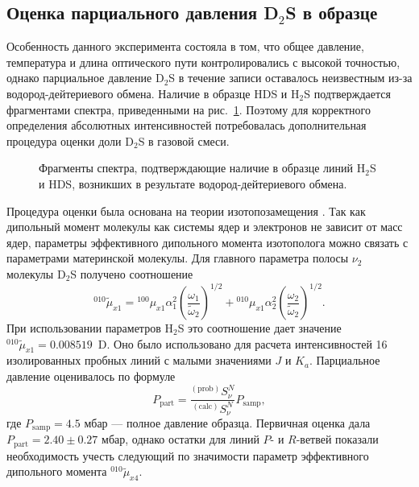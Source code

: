 \subsection{Оценка парциального давления D$_2$S в образце}

Особенность данного эксперимента состояла в том, что общее давление, температура и длина оптического
пути контролировались с высокой точностью, однако парциальное давление D$_2$S в течение записи
оставалось неизвестным из-за водород-дейтериевого обмена. Наличие в образце HDS и H$_2$S подтверждается
фрагментами спектра, приведенными на рис.~\ref{fig:d2s_hds_h2s}. Поэтому для корректного определения
абсолютных интенсивностей потребовалась дополнительная процедура оценки доли D$_2$S в газовой смеси.

\begin{figure}[htbp]
    \centering
    \caption{Фрагменты спектра, подтверждающие наличие в образце линий H$_2$S и HDS, возникших в
    результате водород-дейтериевого обмена.}
    \label{fig:d2s_hds_h2s}
\end{figure}

Процедура оценки была основана на теории изотопозамещения \cite{byk,Ulenikov2019a,Ulenikov2020a}. Так
как дипольный момент молекулы как системы ядер и электронов не зависит от масс ядер, параметры
эффективного дипольного момента изотополога можно связать с параметрами материнской молекулы. Для
главного параметра полосы $\nu_2$ молекулы D$_2$S получено соотношение
\begin{equation}
{}^{010}\widetilde{\mu}_{x1}= {}^{100}\mu_{x1}\alpha^2_1
\left(\frac{\omega_1}{\widetilde{\omega}_2}\right)^{1/2}+
{}^{010}\mu_{x1}\alpha^2_2
\left(\frac{\omega_2}{\widetilde{\omega}_2}\right)^{1/2}.
\label{eq:d2s_mu_iso}
\end{equation}
При использовании параметров H$_2$S \cite{h2s_ulenikov2018_bending,h2s_lechuga1984} это соотношение
дает значение ${}^{010}\widetilde{\mu}_{x1}=0.008519$~D. Оно было использовано для расчета
интенсивностей 16 изолированных пробных линий с малыми значениями $J$ и $K_a$. Парциальное давление
оценивалось по формуле
\begin{equation}
P_{\text{part}}=\frac{{}^{(\text{prob})}S^N_{\nu}}{{}^{(\text{calc})}S^N_{\nu}}P_{\text{samp}},
\label{eq:d2s_partial_pressure}
\end{equation}
где $P_{\text{samp}}=4.5$ мбар --- полное давление образца. Первичная оценка дала
$P_{\text{part}}=2.40\pm0.27$ мбар, однако остатки для линий $P$- и $R$-ветвей показали необходимость
учесть следующий по значимости параметр эффективного дипольного момента ${}^{010}\widetilde{\mu}_{x4}$.

